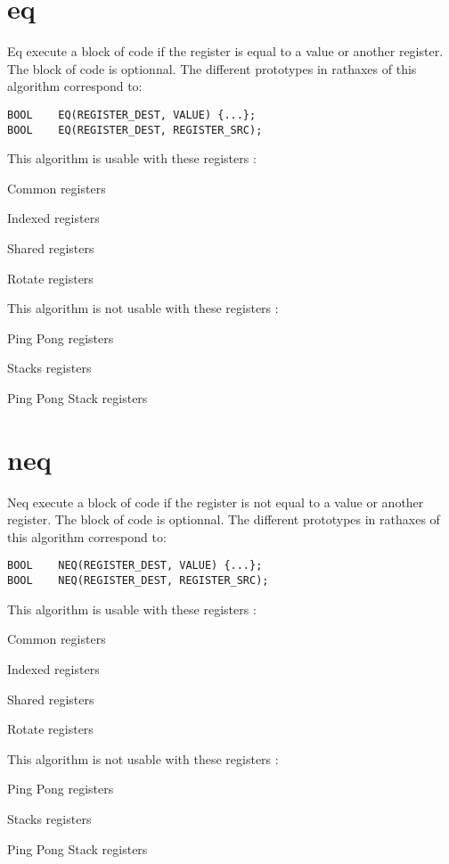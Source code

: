\documentclass[11pt]{report}
\begin{document}
\section{eq}
Eq execute a block of code if the register is equal to a value or another register.
The block of code is optionnal.
The different prototypes in rathaxes of this algorithm correspond to:
\begin{lstlisting}
BOOL	EQ(REGISTER_DEST, VALUE) {...};
BOOL	EQ(REGISTER_DEST, REGISTER_SRC);
\end{lstlisting}
This algorithm is usable with these registers : 
\begin{description}
	\item{Common registers}
	\item{Indexed registers}
	\item{Shared registers}
	\item{Rotate registers}
\end{description}
This algorithm is not usable with these registers : 
\begin{description}
	\item{Ping Pong registers}
	\item{Stacks registers}
	\item{Ping Pong Stack registers}
\end{description}

\section{neq}
Neq execute a block of code if the register is not equal to a value or another register.
The block of code is optionnal.
The different prototypes in rathaxes of this algorithm correspond to:
\begin{lstlisting}
BOOL	NEQ(REGISTER_DEST, VALUE) {...};
BOOL	NEQ(REGISTER_DEST, REGISTER_SRC);
\end{lstlisting}
This algorithm is usable with these registers : 
\begin{description}
	\item{Common registers}
	\item{Indexed registers}
	\item{Shared registers}
	\item{Rotate registers}
\end{description}
This algorithm is not usable with these registers : 
\begin{description}
	\item{Ping Pong registers}
	\item{Stacks registers}
	\item{Ping Pong Stack registers}
\end{description}
\end{document}
